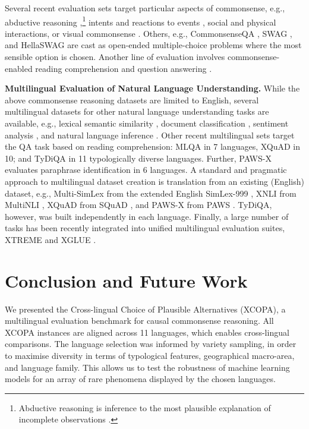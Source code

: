 \documentclass[11pt,a4paper]{article}
\newcommand{\ignore}[1]{}
\begin{document}
Several recent evaluation sets target particular \ignore{well-defined} aspects of commonsense, e.g., abductive reasoning \cite{Bhagavatula:2020iclr},\footnote{Abductive reasoning is inference to the most plausible explanation of incomplete observations \cite{Peirce:1960book}. 
} intents and reactions to events \cite{Rashkin:2018acl}, social \cite{Sap:2019siqa} and physical \cite{Bisk:2020aaai} interactions, or visual commonsense \cite{Zellers:2019cvpr}. Others, e.g., CommonsenseQA \cite{Talmor:2019naacl}, SWAG \cite{Zellers:2018emnlp}, and HellaSWAG \cite{Zellers:2019acl} are cast as open-ended multiple-choice problems where the most sensible option is chosen.
Another line of evaluation involves commonsense-enabled reading comprehension and question answering \cite{Ostermann:2018lrec,Zhang:2018arxiv,Huang:2019emnlp}. 

\vspace{1.6mm}
\noindent \textbf{Multilingual Evaluation of Natural Language Understanding.} While the above commonsense reasoning datasets are limited to English, several multilingual datasets for other natural language understanding tasks are available, e.g.,
lexical semantic similarity \cite[Multi-SimLex;][]{Vulic:2020multisimlex}, document classification \cite[MLDoc;][]{Schwenk:2018lrec}, sentiment analysis \cite{Barnes:2018acl}, and natural language inference \cite[XNLI;][]{Conneau:2018emnlp}. Other recent multilingual sets target the QA task based on reading comprehension: MLQA \cite{Lewis:2019arxiv} in 7 languages, XQuAD \cite{Artetxe:2019arxiv} in 10; and TyDiQA \cite{tydiqa} in 11 typologically diverse languages. Further, PAWS-X \cite{Yang:2019emnlp} evaluates paraphrase identification in 6 languages. A standard and pragmatic approach to multilingual dataset creation is translation from an existing (English) dataset, e.g., Multi-SimLex from the extended English SimLex-999 \cite{Hill:2015cl}, XNLI from MultiNLI \cite{Williams:2018naacl}, XQuAD from SQuAD \cite{Rajpurkar:2016emnlp}, and PAWS-X from PAWS \cite{Zhang:2019naacl}. TyDiQA, however, was built independently in each language.
Finally, a large number of tasks has been recently integrated into unified multilingual evaluation suites, XTREME \cite{Hu:2020arxiv} and XGLUE \cite{Liang:2020xglue}.  
\section{Conclusion and Future Work}
\label{s:conclusion}
We presented the Cross-lingual Choice of Plausible Alternatives (XCOPA), a multilingual evaluation benchmark for causal commonsense reasoning. All XCOPA instances are aligned across 11 languages, which enables cross-lingual comparisons. The language selection was informed by variety sampling, in order to maximise diversity in terms of typological features, geographical macro-area, and language family. This allows us to test the robustness of machine learning models for an array of rare phenomena displayed by the chosen languages.
\end{document}
